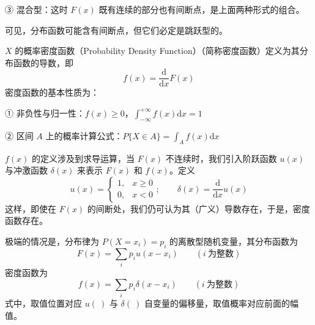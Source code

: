 \documentclass[11pt,openany,UTF8]{ctexbook}
\newcommand{\dif}{\mathrm{d}}                      %
\begin{document}
③ 混合型\nobreak：这时 $F(x)$ 既有连续的部分也有间断点\nobreak，是上面两种形式的组合\nobreak。

可见\nobreak，分布函数可能含有间断点\nobreak，但它们必定是跳跃型的\nobreak。

$X$ 的概率密度函数（Probability Density Function\nobreak）（简称密度函数\nobreak）定义为其分布函数的导数\nobreak，即
\begin{equation}
f(x)=\frac{\dif}{\dif x}F(x)
\label{eq:1.8}
\end{equation}
密度函数的基本性质为\nobreak：

① 非负性与归一性\nobreak：$f(x)\geqslant 0$\nobreak，$\int_{-\infty}^{+\infty}f(x)\dif x=1$

② 区间 $A$ 上的概率计算公式\nobreak：$P\{X\in A\}=\int_{A}f(x)\dif x$

$f(x)$ 的定义涉及到求导运算\nobreak，当 $F(x)$ 不连续时\nobreak，我们引入阶跃函数 $u(x)$ 与冲激函数 $\delta(x)$ 来表示 $F(x)$ 和 $f(x)$\nobreak。定义
\begin{equation}
u(x)=\begin{cases}1, & x\geqslant 0\\ 0, & x<0\end{cases};\qquad \delta(x)=\frac{\dif}{\dif x}u(x)
\label{eq:1.9}
\end{equation}
这样\nobreak，即使在 $F(x)$ 的间断处\nobreak，我们仍可认为其（广义\nobreak）导数存在\nobreak，于是\nobreak，密度函数存在\nobreak。

极端的情况是\nobreak，分布律为 $P(X=x_i)=p_i$ 的离散型随机变量\nobreak，其分布函数为
\begin{equation}
F(x)=\sum_{i}p_iu(x-x_i)\qquad (i\ \text{为整数})
\label{eq:1.10}
\end{equation}
密度函数为
\begin{equation}
f(x)=\sum_{i}p_i\delta(x-x_i)\qquad (i\ \text{为整数})
\label{eq:1.11}
\end{equation}
式中\nobreak，取值位置对应 $u(\ )$ 与 $\delta(\ )$ 自变量的偏移量\nobreak，取值概率对应前面的幅值\nobreak。
\end{document}
